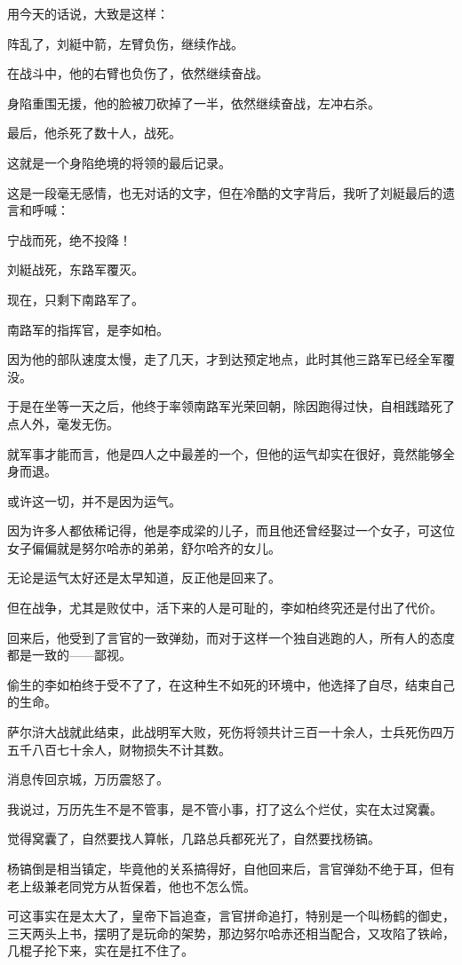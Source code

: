\begin{multicols}{\theparacolNo}
用今天的话说，大致是这样：

阵乱了，刘綎中箭，左臂负伤，继续作战。

在战斗中，他的右臂也负伤了，依然继续奋战。

身陷重围无援，他的脸被刀砍掉了一半，依然继续奋战，左冲右杀。

最后，他杀死了数十人，战死。

这就是一个身陷绝境的将领的最后记录。

这是一段毫无感情，也无对话的文字，但在冷酷的文字背后，我听了刘綎最后的遗言和呼喊：

宁战而死，绝不投降！

刘綎战死，东路军覆灭。

现在，只剩下南路军了。

南路军的指挥官，是李如柏。

因为他的部队速度太慢，走了几天，才到达预定地点，此时其他三路军已经全军覆没。

于是在坐等一天之后，他终于率领南路军光荣回朝，除因跑得过快，自相践踏死了点人外，毫发无伤。

就军事才能而言，他是四人之中最差的一个，但他的运气却实在很好，竟然能够全身而退。

或许这一切，并不是因为运气。

因为许多人都依稀记得，他是李成梁的儿子，而且他还曾经娶过一个女子，可这位女子偏偏就是努尔哈赤的弟弟，舒尔哈齐的女儿。

无论是运气太好还是太早知道，反正他是回来了。

但在战争，尤其是败仗中，活下来的人是可耻的，李如柏终究还是付出了代价。

回来后，他受到了言官的一致弹劾，而对于这样一个独自逃跑的人，所有人的态度都是一致的——鄙视。

偷生的李如柏终于受不了了，在这种生不如死的环境中，他选择了自尽，结束自己的生命。

萨尔浒大战就此结束，此战明军大败，死伤将领共计三百一十余人，士兵死伤四万五千八百七十余人，财物损失不计其数。

消息传回京城，万历震怒了。

我说过，万历先生不是不管事，是不管小事，打了这么个烂仗，实在太过窝囊。

觉得窝囊了，自然要找人算帐，几路总兵都死光了，自然要找杨镐。

杨镐倒是相当镇定，毕竟他的关系搞得好，自他回来后，言官弹劾不绝于耳，但有老上级兼老同党方从哲保着，他也不怎么慌。

可这事实在是太大了，皇帝下旨追查，言官拼命追打，特别是一个叫杨鹤的御史，三天两头上书，摆明了是玩命的架势，那边努尔哈赤还相当配合，又攻陷了铁岭，几棍子抡下来，实在是扛不住了。


\end{multicols}
